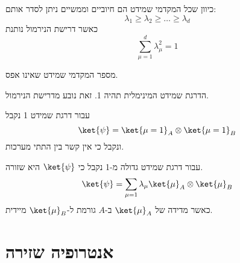 \documentclass{tstextbook}
\begin{document}
\begin{proposition}
כיוון שכל המקדמי שמידט הם חיוביים וממשיים ניתן לסדר אותם:
$$\lambda_{1}\geq \lambda_{2} \geq \dots \geq \lambda_{d}$$
כאשר דרישת הנירמול נותנת
$$\sum_{\mu=1}^{d} \lambda_{\mu}^{2}=1$$

\end{proposition}
\begin{definition}
מספר המקדמי שמידט שאינו אפס.

\end{definition}
\begin{remark}
הדרגת שמידט המינימלית תהיה 1. זאת נובע מדרישת הנירמול.

\end{remark}
\begin{proposition}
עבור דרגת שמידט 1 נקבל
$$\ket{\psi} = \ket{\mu=1}_{A} \otimes \ket{\mu=1}_{B}$$
ונקבל כי אין קשר בין התתי מערכות.

\end{proposition}
\begin{proposition}
עבור דרגת שמידט גדולה מ-1 נקבל כי \(\ket{\psi}\) היא שזורה.
$$\ket{\psi} =\sum_{\mu=1} \lambda_{\mu} \ket{\mu}_{A}\otimes \ket{\mu}_{B}   $$
כאשר מדידה של \(\ket{\mu}_{A}\) ב-\(A\) גורמת ל-\(\ket{\mu}_{B}\) מיידית.

\end{proposition}
\section{אנטרופיה שזירה}
\end{document}

